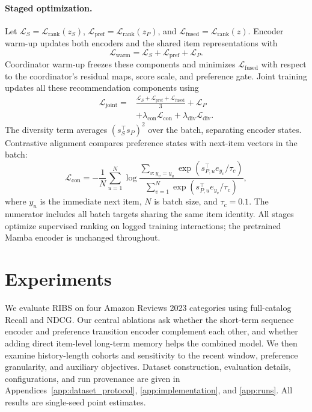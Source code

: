 \documentclass[11pt]{article}
\begin{document}
\paragraph{Staged optimization.}
Let $\mathcal L_S=\mathcal L_{\mathrm{rank}}(z_S)$, $\mathcal L_{\mathrm{pref}}=\mathcal L_{\mathrm{rank}}(z_P)$, and $\mathcal L_{\mathrm{fused}}=\mathcal L_{\mathrm{rank}}(z)$. Encoder warm-up updates both encoders and the shared item representations with
\begin{equation}
 \mathcal L_{\mathrm{warm}}=\mathcal L_S+\mathcal L_{\mathrm{pref}}+\mathcal L_P.
\end{equation}
Coordinator warm-up freezes these components and minimizes $\mathcal L_{\mathrm{fused}}$ with respect to the coordinator's residual maps, score scale, and preference gate. Joint training updates all these recommendation components using
\begin{align}
 \mathcal L_{\mathrm{joint}}={}&\frac{\mathcal L_S+\mathcal L_{\mathrm{pref}}+\mathcal L_{\mathrm{fused}}}{3}
 +\mathcal L_P\nonumber\\
 &+\lambda_{\mathrm{con}}\mathcal L_{\mathrm{con}}
 +\lambda_{\mathrm{div}}\mathcal L_{\mathrm{div}}.
\end{align}
The diversity term averages $(s_S^\top s_P)^2$ over the batch, separating encoder states. Contrastive alignment compares preference states with next-item vectors in the batch:
\begin{equation}
 \mathcal L_{\mathrm{con}}=-\frac{1}{N}\sum_{u=1}^{N}
 \log\frac{\sum_{v:y_v=y_u}\exp(s_{P,u}^\top e_{y_v}/\tau_c)}
 {\sum_{v=1}^{N}\exp(s_{P,u}^\top e_{y_v}/\tau_c)},
\end{equation}
where $y_u$ is the immediate next item, $N$ is batch size, and $\tau_c=0.1$. The numerator includes all batch targets sharing the same item identity. All stages optimize supervised ranking on logged training interactions; the pretrained Mamba encoder is unchanged throughout.

\section{Experiments}
\label{sec:experiments}
We evaluate RIBS on four Amazon Reviews 2023 categories using full-catalog Recall and NDCG. Our central ablations ask whether the short-term sequence encoder and preference transition encoder complement each other, and whether adding direct item-level long-term memory helps the combined model. We then examine history-length cohorts and sensitivity to the recent window, preference granularity, and auxiliary objectives. Dataset construction, evaluation details, configurations, and run provenance are given in Appendices~\ref{app:dataset_protocol}, \ref{app:implementation}, and \ref{app:runs}. All results are single-seed point estimates.
\end{document}
